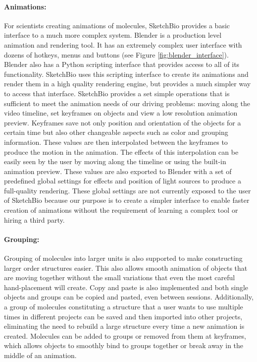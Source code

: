 \documentclass[twocolumn]{bmcart}%
\begin{document}
\paragraph*{Animations:}
For scientists creating animations of molecules, SketchBio provides a basic interface to a much more complex system.
Blender is a production level animation and rendering tool.  It has an extremely complex user interface with dozens of hotkeys, menus and buttons (see Figure \ref{fig:blender_interface}).
Blender also has a Python scripting interface that provides access to all of its functionality.
SketchBio uses this scripting interface to create its animations and render them in a high quality rendering engine, but provides a much simpler way to access that interface.
SketchBio provides a set simple operations that is sufficient to meet the animation needs of our driving problems: moving along the video timeline, set keyframes on objects and view a low resolution animation preview.
Keyframes save not only position and orientation of the objects for a certain time but also other changeable aspects such as color and grouping information.
These values are then interpolated between the keyframes to produce the motion in the animation.
The effects of this interpolation can be easily seen by the user by moving along the timeline or using the built-in animation preview.
These values are also exported to Blender with a set of predefined global settings for effects and position of light sources to produce a full-quality rendering.
These global settings are not currently exposed to the user of SketchBio because our purpose is to create a simpler interface to enable faster creation of animations without the requirement of learning a complex tool or hiring a third party.

\paragraph*{Grouping:}
Grouping of molecules into larger units is also supported to make constructing larger order structures easier.
This also allows smooth animation of objects that are moving together without the small variations that even the most careful hand-placement will create.
Copy and paste is also implemented and both single objects and groups can be copied and pasted, even between sessions. Additionally, a group of molecules constituting a structure that a user wants to use multiple times in different projects can be saved and then imported into other projects, eliminating the need to rebuild a large structure every time a new animation is created.
Molecules can be added to groups or removed from them at keyframes, which allows objects to smoothly bind to groups together or break away in the middle of an animation.
\end{document}
